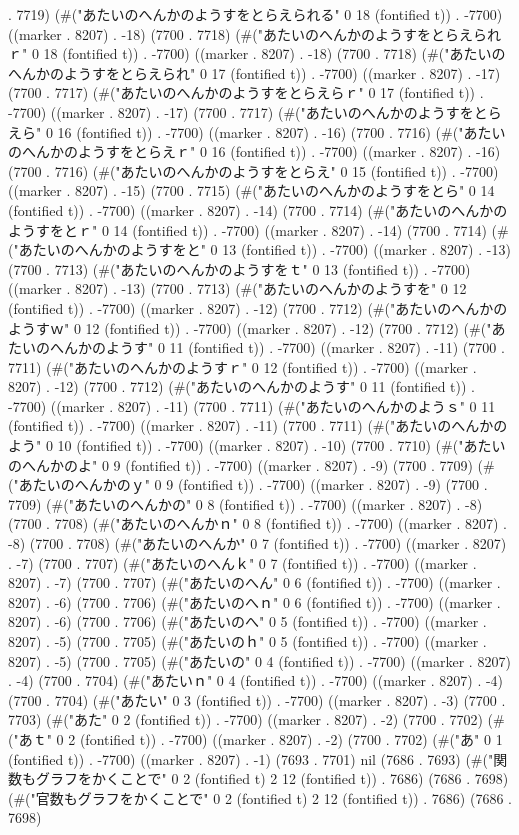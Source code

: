 . 7719) (#("あたいのへんかのようすをとらえられる" 0 18 (fontified t)) . -7700) ((marker . 8207) . -18) (7700 . 7718) (#("あたいのへんかのようすをとらえられｒ" 0 18 (fontified t)) . -7700) ((marker . 8207) . -18) (7700 . 7718) (#("あたいのへんかのようすをとらえられ" 0 17 (fontified t)) . -7700) ((marker . 8207) . -17) (7700 . 7717) (#("あたいのへんかのようすをとらえらｒ" 0 17 (fontified t)) . -7700) ((marker . 8207) . -17) (7700 . 7717) (#("あたいのへんかのようすをとらえら" 0 16 (fontified t)) . -7700) ((marker . 8207) . -16) (7700 . 7716) (#("あたいのへんかのようすをとらえｒ" 0 16 (fontified t)) . -7700) ((marker . 8207) . -16) (7700 . 7716) (#("あたいのへんかのようすをとらえ" 0 15 (fontified t)) . -7700) ((marker . 8207) . -15) (7700 . 7715) (#("あたいのへんかのようすをとら" 0 14 (fontified t)) . -7700) ((marker . 8207) . -14) (7700 . 7714) (#("あたいのへんかのようすをとｒ" 0 14 (fontified t)) . -7700) ((marker . 8207) . -14) (7700 . 7714) (#("あたいのへんかのようすをと" 0 13 (fontified t)) . -7700) ((marker . 8207) . -13) (7700 . 7713) (#("あたいのへんかのようすをｔ" 0 13 (fontified t)) . -7700) ((marker . 8207) . -13) (7700 . 7713) (#("あたいのへんかのようすを" 0 12 (fontified t)) . -7700) ((marker . 8207) . -12) (7700 . 7712) (#("あたいのへんかのようすｗ" 0 12 (fontified t)) . -7700) ((marker . 8207) . -12) (7700 . 7712) (#("あたいのへんかのようす" 0 11 (fontified t)) . -7700) ((marker . 8207) . -11) (7700 . 7711) (#("あたいのへんかのようすｒ" 0 12 (fontified t)) . -7700) ((marker . 8207) . -12) (7700 . 7712) (#("あたいのへんかのようす" 0 11 (fontified t)) . -7700) ((marker . 8207) . -11) (7700 . 7711) (#("あたいのへんかのようｓ" 0 11 (fontified t)) . -7700) ((marker . 8207) . -11) (7700 . 7711) (#("あたいのへんかのよう" 0 10 (fontified t)) . -7700) ((marker . 8207) . -10) (7700 . 7710) (#("あたいのへんかのよ" 0 9 (fontified t)) . -7700) ((marker . 8207) . -9) (7700 . 7709) (#("あたいのへんかのｙ" 0 9 (fontified t)) . -7700) ((marker . 8207) . -9) (7700 . 7709) (#("あたいのへんかの" 0 8 (fontified t)) . -7700) ((marker . 8207) . -8) (7700 . 7708) (#("あたいのへんかｎ" 0 8 (fontified t)) . -7700) ((marker . 8207) . -8) (7700 . 7708) (#("あたいのへんか" 0 7 (fontified t)) . -7700) ((marker . 8207) . -7) (7700 . 7707) (#("あたいのへんｋ" 0 7 (fontified t)) . -7700) ((marker . 8207) . -7) (7700 . 7707) (#("あたいのへん" 0 6 (fontified t)) . -7700) ((marker . 8207) . -6) (7700 . 7706) (#("あたいのへｎ" 0 6 (fontified t)) . -7700) ((marker . 8207) . -6) (7700 . 7706) (#("あたいのへ" 0 5 (fontified t)) . -7700) ((marker . 8207) . -5) (7700 . 7705) (#("あたいのｈ" 0 5 (fontified t)) . -7700) ((marker . 8207) . -5) (7700 . 7705) (#("あたいの" 0 4 (fontified t)) . -7700) ((marker . 8207) . -4) (7700 . 7704) (#("あたいｎ" 0 4 (fontified t)) . -7700) ((marker . 8207) . -4) (7700 . 7704) (#("あたい" 0 3 (fontified t)) . -7700) ((marker . 8207) . -3) (7700 . 7703) (#("あた" 0 2 (fontified t)) . -7700) ((marker . 8207) . -2) (7700 . 7702) (#("あｔ" 0 2 (fontified t)) . -7700) ((marker . 8207) . -2) (7700 . 7702) (#("あ" 0 1 (fontified t)) . -7700) ((marker . 8207) . -1) (7693 . 7701) nil (7686 . 7693) (#("関数もグラフをかくことで" 0 2 (fontified t) 2 12 (fontified t)) . 7686) (7686 . 7698) (#("官数もグラフをかくことで" 0 2 (fontified t) 2 12 (fontified t)) . 7686) (7686 . 7698) 